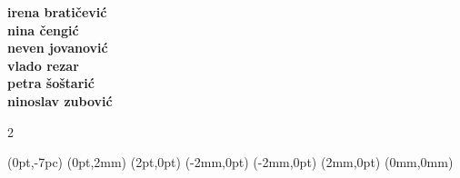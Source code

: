 \documentclass{article}
\begin{document}
  \NewCoffin \result
  \NewCoffin \aaa
  \NewCoffin \bbb
  \NewCoffin \ddd
  \NewCoffin \fff
  \NewCoffin {}
  \NewCoffin {}
  \NewCoffin {}

\SetHorizontalCoffin \result {}
\SetHorizontalCoffin {}
\SetHorizontalCoffin {}
\SetHorizontalCoffin {}

\SetVerticalCoffin \fff {140pt}
                 {\raggedright \fontsize{13}{14}\sffamily\bfseries
                 irena bratičević\\
                 nina čengić\\
                 neven jovanović\\
                 vlado rezar\\
                 petra šoštarić\\
                 ninoslav zubović\\
                 }

\RotateCoffin {}

\ScaleCoffin {} {2}

\SetHorizontalCoffin {}
\SetHorizontalCoffin {}
\SetHorizontalCoffin {}


\JoinCoffins \result                \aaa	[B,l](0pt,-7pc)
\JoinCoffins {} (0pt,2mm)
\JoinCoffins {} \bbb     [B,r](2pt,0pt)
\JoinCoffins {} (-2mm,0pt)
\JoinCoffins {} \fff     [t,r](-2mm,0pt)
\JoinCoffins {} (2mm,0pt)
\JoinCoffins {} \ddd     [B,r](0mm,0mm)
\TypesetCoffin \result
\end{document}
